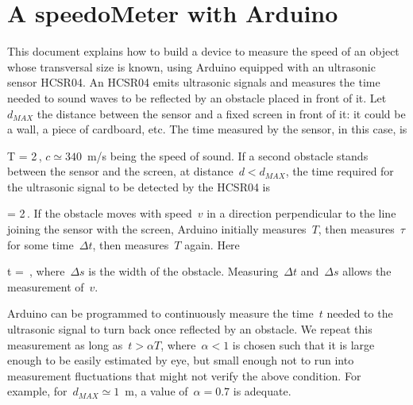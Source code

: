 \documentclass{extra}
\begin{document}
\chapter{A speedoMeter with Arduino}
This document explains how to build a device to measure the speed of an object whose transversal size is known, using Arduino equipped with an ultrasonic sensor HCSR04.
An HCSR04 emits ultrasonic signals and measures the time needed to sound waves to be reflected by an obstacle placed in front of it. Let~$d_{MAX}$ the distance between the sensor and a fixed screen in front of it: it could be a wall, a piece of cardboard, etc. The time measured by the sensor, in this case, is

\beq
T = 2\,,
\eeq
$c\simeq 340$~m/s being the speed of sound. If a second obstacle stands between the sensor and the screen, at distance~$d< d_{MAX}$, the time required for the ultrasonic signal to be detected by the HCSR04 is

\beq
\tau = 2\,.
\eeq
If the obstacle moves with speed~$v$ in a direction perpendicular to the line joining the sensor with the screen, Arduino initially measures~$T$, then measures~$\tau$ for some time~$\Delta t$, then measures~$T$ again. Here

\beq
\Delta t = \,,
\eeq
where~$\Delta s$ is the width of the obstacle. Measuring~$\Delta t$ and~$\Delta s$ allows the measurement of~$v$.

Arduino can be programmed to continuously measure the time~$t$ needed to the ultrasonic signal to turn back once reflected by an obstacle. We repeat this measurement as long as~$t>\alpha T$, where~$\alpha<1$ is chosen such that it is large enough to be easily estimated by eye, but small enough not to run into measurement fluctuations that might not verify the above condition. For example, for~$d_{MAX}\simeq 1$~m, a value of~$\alpha=0.7$ is adequate.
\end{document}
